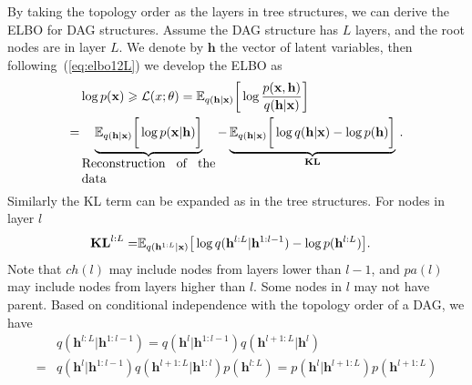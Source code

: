 \documentclass[sigconf, anonymous, review]{acmart}
\theoremstyle{plain}
\theoremstyle{definition}
\theoremstyle{remark}
\begin{document}
By taking the topology order as the layers in tree structures, we can derive the ELBO for DAG structures.  
Assume the DAG structure has $L$ layers, and the root nodes are in layer $L$. 
We denote by $\mathbf{h}$ the vector of latent variables, then following~(\ref{eq:elbo12L}) we develop the ELBO as
\begin{align}  \label{eq:dag_elbo}
&\log p(\mathbf{x})  \geqslant  \mathcal{L}(x;\theta) 
=   \mathbb{E}_{q(\mathbf{h} | \mathbf{x})} \bigg[ \log  \frac{p(\mathbf{x}, \mathbf{h})}{q(\mathbf{h}|\mathbf{x})}  \bigg]  \\ \notag
=&  \underbrace{ \mathbb{E}_{q(\mathbf{h} | \mathbf{x})} \bigg[ \log  p(\mathbf{x} |\mathbf{h})  \bigg] }_{  \parbox{10.5em}{Reconstruction of the data}}  -  \underbrace{  \mathbb{E}_{q(\mathbf{h}| \mathbf{x})} \bigg[  \log q(\mathbf{h}|\mathbf{x}) - \log p( \mathbf{h}) \bigg] }_{\textbf{\text{KL}}} \, .   \notag
\end{align} %
Similarly the KL term can be expanded as in the tree structures. 
For nodes in layer $l$
\begin{align*} 
\textbf{\text{KL}}^{l:L} 
= &\mathbb{E}_{q(\mathbf{h}^{1:L}|\mathbf{x})}\big[  \log q(\mathbf{h}^{l:L}|\mathbf{h}^{1:l-1})- \log p(\mathbf{h}^{l:L})  \big].
\end{align*} %
Note that $ch(l)$ may include nodes from layers lower than $l-1$, and $pa(l)$ may include nodes from layers higher than $l$.
Some nodes in $l$ may not have parent. Based on conditional independence with the topology order of a DAG, we have 
\begin{align} \label{eq:dag_chain_q}
&q(\mathbf{h}^{l:L}|\mathbf{h}^{1:l-1})=q(\mathbf{h}^{l}|\mathbf{h}^{1:l-1})q(\mathbf{h}^{l+1:L}|\mathbf{h}^{l})\\ \label{eq:dag_chain_p}
=&q(\mathbf{h}^{l}|\mathbf{h}^{1:l-1})q(\mathbf{h}^{l+1:L}|\mathbf{h}^{1:l}) p(\mathbf{h}^{l:L}) =p(\mathbf{h}^{l}|\mathbf{h}^{l+1:L})p(\mathbf{h}^{l+1:L})%
\end{align} %
\end{document}
